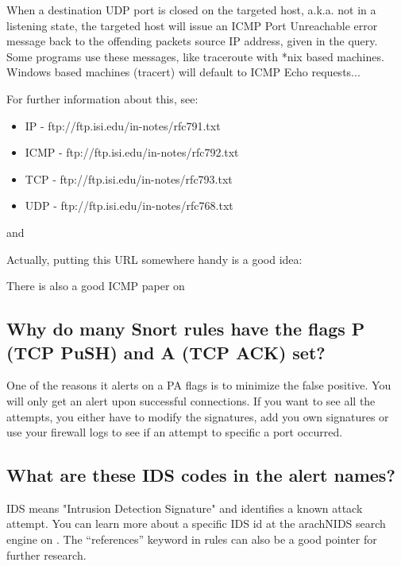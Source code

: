 \documentclass{article}
\begin{document}
When a destination UDP port is closed on the targeted host, a.k.a. not
in a listening state, the targeted host will issue an ICMP Port Unreachable
error message back to the offending packets source IP address, given in
the query.  Some programs use these messages, like traceroute with *nix
based machines. Windows based machines (tracert) will default to
ICMP Echo requests...

For further information about this, see:
\begin{itemize}
\item IP - ftp://ftp.isi.edu/in-notes/rfc791.txt
\item ICMP - ftp://ftp.isi.edu/in-notes/rfc792.txt
\item TCP - ftp://ftp.isi.edu/in-notes/rfc793.txt
\item UDP - ftp://ftp.isi.edu/in-notes/rfc768.txt
\end{itemize}

and


Actually, putting this URL somewhere handy is a good idea:


There is also a good ICMP paper on 

\subsection{Why do many Snort rules have the flags P (TCP PuSH) and A (TCP ACK) set? }

One of the reasons it alerts on a PA flags is to minimize the false
positive. You will only get an alert upon successful connections. If you
want to see all the attempts, you either have to modify the signatures, add
you own signatures or use your firewall logs to see if an attempt to
specific a port occurred.


\subsection{What are these IDS codes in the alert names? }

IDS means "Intrusion Detection Signature" and identifies a
known attack attempt. You can learn more about a specific IDS id
at the arachNIDS search engine on 
.
The ``references'' keyword in rules can also be a good pointer 
for further research.
\end{document}
